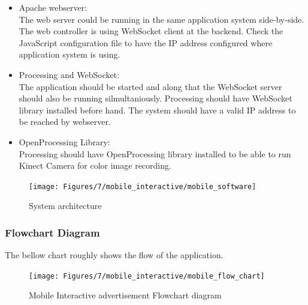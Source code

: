 \begin{itemize}
\item Apache webserver:\\
The web server could be running in the same application system side-by-side. The web controller is using WebSocket client at the backend. Check the JavaScript configuration
file to have the IP address configured where application system is using.
\item Processing and WebSocket:\\
The application should be started and along that the WebSocket server should also be running silmultaniously. Processing should have WebSocket library installed before hand. The system should have a valid IP address to be reached by webserver.
\item OpenProcessing Library:\\
Processing should have OpenProcessing library installed to be able to run Kinect Camera for color image recording.
\end{itemize}


\begin{figure}[H]
    \centering
    \texttt{[image: Figures/7/mobile\_interactive/mobile\_software]}
    \caption{System architecture}%
    \label{fig:mobile_software_setup}%
\end{figure}



\subsubsection{Flowchart Diagram}
The bellow chart roughly shows the flow of the application.
\begin{figure}[H]
    \centering
    \texttt{[image: Figures/7/mobile\_interactive/mobile\_flow\_chart]}
    \caption{Mobile Interactive advertisement Flowchart diagram}%
    \label{fig:mobile_flowchat}%
\end{figure}




